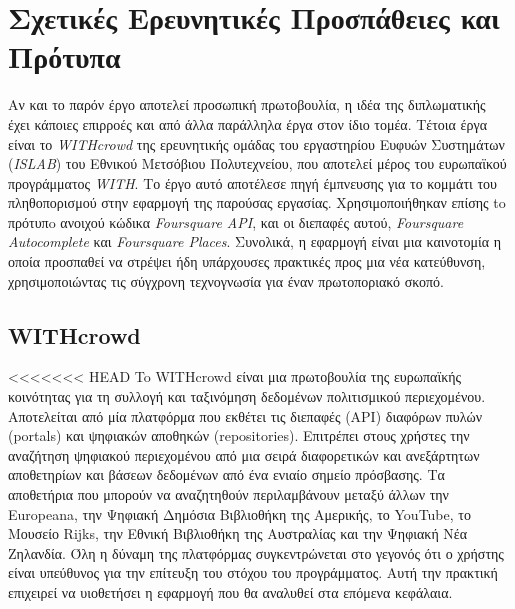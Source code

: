 \section{Σχετικές Ερευνητικές Προσπάθειες και Πρότυπα}
Αν και το παρόν έργο αποτελεί προσωπική πρωτοβουλία, η ιδέα της διπλωματικής έχει κάποιες επιρροές και από άλλα παράλληλα έργα στον ίδιο τομέα. Τέτοια έργα είναι το \textit{WITHcrowd} της ερευνητικής ομάδας του εργαστηρίου Ευφυών Συστημάτων (\textit{ISLAB}) του Εθνικού Μετσόβιου  Πολυτεχνείου, που αποτελεί μέρος του ευρωπαϊκού προγράμματος \textit{WITH}. Το έργο αυτό αποτέλεσε πηγή έμπνευσης για το κομμάτι του πληθοπορισμού στην εφαρμογή της παρούσας εργασίας. Χρησιμοποιήθηκαν επίσης to πρότυπo ανοιχού κώδικα \textit{Foursquare API}, και οι διεπαφές αυτού,  \textit{Foursquare Autocomplete} και \textit{Foursquare Places}. Συνολικά, η εφαρμογή είναι μια καινοτομία η οποία προσπαθεί να στρέψει ήδη υπάρχουσες πρακτικές προς μια νέα κατεύθυνση, χρησιμοποιώντας τις σύγχρονη τεχνογνωσία για έναν πρωτοποριακό σκοπό.   

\subsection{WITHcrowd}
<<<<<<< HEAD
To WITHcrowd \cite{[WIT+18]} είναι μια πρωτοβουλία της ευρωπαϊκής κοινότητας για τη συλλογή και ταξινόμηση δεδομένων πολιτισμικού περιεχομένου. Αποτελείται από μία πλατφόρμα που εκθέτει τις διεπαφές (ΑΡΙ) διαφόρων πυλών (portals) και ψηφιακών αποθηκών (repositories). Eπιτρέπει στους χρήστες την αναζήτηση ψηφιακού περιεχομένου από μια σειρά διαφορετικών και ανεξάρτητων αποθετηρίων και βάσεων δεδομένων από ένα ενιαίο σημείο πρόσβασης. Τα αποθετήρια που μπορούν να αναζητηθούν περιλαμβάνουν μεταξύ άλλων την Europeana, την Ψηφιακή Δημόσια Βιβλιοθήκη της Αμερικής, το YouTube, το Μουσείο Rijks, την Εθνική Βιβλιοθήκη της Αυστραλίας και την Ψηφιακή Νέα Ζηλανδία. Όλη η δύναμη της πλατφόρμας συγκεντρώνεται στο γεγονός ότι ο χρήστης είναι υπεύθυνος για την επίτευξη του στόχου του προγράμματος. Αυτή την πρακτική επιχειρεί να υιοθετήσει η εφαρμογή που θα αναλυθεί στα επόμενα κεφάλαια. 

